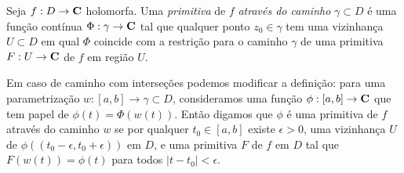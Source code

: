 \begin{defin}
Seja $f : D \to \mathbf{C}$ holomorfa.
Uma \emph{primitiva} de $f$ \emph{através do caminho} $\gamma\subset D$
é uma função contínua $\Phi : \gamma \to \mathbf{C}$
tal que qualquer ponto $z_0 \in \gamma$ tem uma vizinhança
$U \subset D$ em qual $\Phi$ coincide com a restrição para o caminho $\gamma$
de uma primitiva $F: U\to \mathbf{C}$ de $f$ em região $U$.

Em caso de caminho com interseções podemos modificar a definição:
para uma parametrização $w: [a,b] \to \gamma \subset D$,
consideramos uma função $\phi: [a,b] \to \mathbf{C}$ que tem papel de $\phi(t) = \Phi(w(t))$.
Então digamos que $\phi$ é uma primitiva de $f$ através do caminho $w$
se por qualquer $t_0 \in [a,b]$ existe $\epsilon>0$, uma vizinhança $U$ de
$\phi((t_0-\epsilon,t_0+\epsilon))$ em $D$,
e uma primitiva $F$ de $f$ em $D$ tal que $F(w(t)) = \phi(t)$ para todos $|t-t_0|<\epsilon$.
\end{defin}

